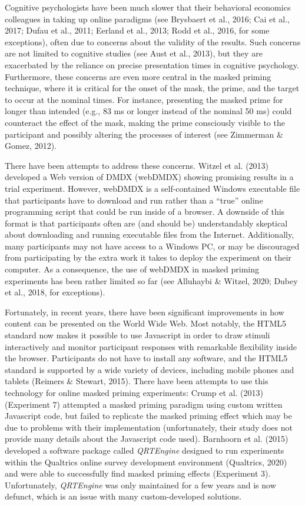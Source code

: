 \documentclass[
  english,
  man,floatsintext]{apa6}
\begin{document}
Cognitive psychologists have been much slower that their behavioral economics colleagues in taking up online paradigms (see Brysbaert et al., 2016; Cai et al., 2017; Dufau et al., 2011; Eerland et al., 2013; Rodd et al., 2016, for some exceptions), often due to concerns about the validity of the results. Such concerns are not limited to cognitive studies (see Aust et al., 2013), but they are exacerbated by the reliance on precise presentation times in cognitive psychology. Furthermore, these concerns are even more central in the masked priming technique, where it is critical for the onset of the mask, the prime, and the target to occur at the nominal times. For instance, presenting the masked prime for longer than intended (e.g., 83 ms or longer instead of the nominal 50 ms) could counteract the effect of the mask, making the prime consciously visible to the participant and possibly altering the processes of interest (see Zimmerman \& Gomez, 2012).

There have been attempts to address these concerns. Witzel et al. (2013) developed a Web version of DMDX (webDMDX) showing promising results in a trial experiment. However, webDMDX is a self-contained Windows executable file that participants have to download and run rather than a ``true'' online programming script that could be run inside of a browser. A downside of this format is that participants often are (and should be) understandably skeptical about downloading and running executable files from the Internet. Additionally, many participants may not have access to a Windows PC, or may be discouraged from participating by the extra work it takes to deploy the experiment on their computer. As a consequence, the use of webDMDX in masked priming experiments has been rather limited so far (see Alluhaybi \& Witzel, 2020; Dubey et al., 2018, for exceptions).

Fortunately, in recent years, there have been significant improvements in how content can be presented on the World Wide Web. Most notably, the HTML5 standard now makes it possible to use Javascript in order to draw stimuli interactively and monitor participant responses with remarkable flexibility inside the browser. Participants do not have to install any software, and the HTML5 standard is supported by a wide variety of devices, including mobile phones and tablets (Reimers \& Stewart, 2015). There have been attempts to use this technology for online masked priming experiments: Crump et al. (2013) (Experiment 7) attempted a masked priming paradigm using custom written Javascript code, but failed to replicate the masked priming effect which may be due to problems with their implementation (unfortunately, their study does not provide many details about the Javascript code used). Barnhoorn et al. (2015) developed a software package called \emph{QRTEngine} designed to run experiments within the Qualtrics online survey development environment (Qualtrics, 2020) and were able to successfully find masked priming effects (Experiment 3). Unfortunately, \emph{QRTEngine} was only maintained for a few years and is now defunct, which is an issue with many custom-developed solutions.
\end{document}
